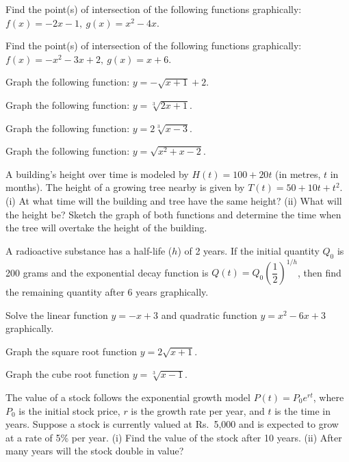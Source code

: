 \documentclass[11pt,a4paper]{article}
\begin{document}
\begin{longlist}
\item Find the point(s) of intersection of the following functions graphically: $f(x)=-2x-1,\ g(x)=x^2-4x$.

\item Find the point(s) of intersection of the following functions graphically: $f(x)=-x^2-3x+2,\ g(x)=x+6$.

\item Graph the following function: $y=-\sqrt{x+1}+2$.

\item Graph the following function: $y=\sqrt[3]{2x+1}$.

\item Graph the following function: $y=2\sqrt[3]{x-3}$.

\item Graph the following function: $y=\sqrt{x^2+x-2}$.

\item A building's height over time is modeled by $H(t)=100+20t$ (in metres, $t$ in months). The height of a growing tree nearby is given by $T(t)=50+10t+t^2$.
(i) At what time will the building and tree have the same height?
(ii) What will the height be? Sketch the graph of both functions and determine the time when the tree will overtake the height of the building.

\item A radioactive substance has a half-life ($h$) of 2 years. If the initial quantity $Q_0$ is 200 grams and the exponential decay function is $Q(t)=Q_0\left(\dfrac{1}{2}\right)^{1/h}$, then find the remaining quantity after 6 years graphically.

\item Solve the linear function $y=-x+3$ and quadratic function $y=x^2-6x+3$ graphically.

\item Graph the square root function $y=2\sqrt{x+1}$.

\item Graph the cube root function $y=\sqrt[3]{x-1}$.

\item The value of a stock follows the exponential growth model $P(t)=P_0e^{rt}$, where $P_0$ is the initial stock price, $r$ is the growth rate per year, and $t$ is the time in years. Suppose a stock is currently valued at Rs.\ 5{,}000 and is expected to grow at a rate of 5\% per year. (i) Find the value of the stock after 10 years. (ii) After many years will the stock double in value?


\end{longlist}
\end{document}
